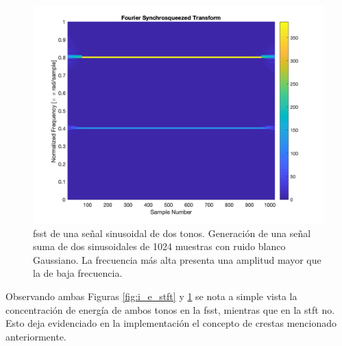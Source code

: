 \begin{figure}[H]
  \centering
  \includegraphics[scale=0.35]{sections/chapter-05/images/fsst.png}
  \caption[\acrshort{fsst} de una señal sinusoidal de dos tonos]{\acrshort{fsst} de una señal sinusoidal de dos tonos.
  Generación de una señal suma de dos sinusoidales de 1024 muestras con ruido blanco Gaussiano. La frecuencia más alta
  presenta una amplitud mayor que la de baja frecuencia.}
  \label{fig:i_e_fsst}
\end{figure}

\indent Observando ambas Figuras \ref{fig:i_e_stft} y \ref{fig:i_e_fsst} se nota a simple vista la concentración de
energía de ambos tonos en la \acrshort{fsst}, mientras que en la \acrshort{stft} no. Esto deja evidenciado en la
implementación el concepto de crestas mencionado anteriormente.

